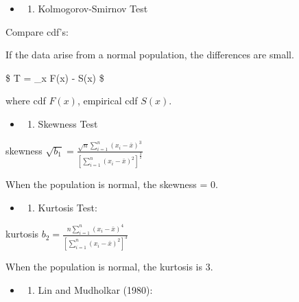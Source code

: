 \documentclass[
]{book}
\providecommand{\tightlist}{%
  \setlength{\itemsep}{0pt}\setlength{\parskip}{0pt}}
\begin{document}
{{{\begin{itemize}
\item
  \begin{enumerate}
  \def\labelenumi{\arabic{enumi}.}
  \setcounter{enumi}{1}
  \tightlist
  \item
    Kolmogorov-Smirnov Test
  \end{enumerate}
\end{itemize}

Compare cdf's:

If the data arise from a normal population, the differences are small.

\$
T = \sup\_x \left\vert F(x) - S(x) \right \vert
\$

where cdf \(F(x)\), empirical cdf \(S(x)\).

\begin{itemize}
\item
  \begin{enumerate}
  \def\labelenumi{\arabic{enumi}.}
  \setcounter{enumi}{2}
  \tightlist
  \item
    Skewness Test
  \end{enumerate}
\end{itemize}

skewness \(\sqrt{b_1} = \tfrac{\sqrt{n} \sum_{i=1}^n (x_i - \bar x)^3} {\left[ \sum_{i=1}^n (x_i - \bar x)^2 \right]^{\tfrac{3}{2}}}\)

When the population is normal, the skewness = 0.

\begin{itemize}
\item
  \begin{enumerate}
  \def\labelenumi{\arabic{enumi}.}
  \setcounter{enumi}{3}
  \tightlist
  \item
    Kurtosis Test:
  \end{enumerate}
\end{itemize}

kurtosis \({b_2} = \tfrac{n \sum_{i=1}^n (x_i - \bar x)^4} {\left[ \sum_{i=1}^n (x_i - \bar x)^2 \right]^{3}}\)

When the population is normal, the kurtosis is 3.

\begin{itemize}
\item
  \begin{enumerate}
  \def\labelenumi{\arabic{enumi}.}
  \setcounter{enumi}{4}
  \tightlist
  \item
    Lin and Mudholkar (1980):
  \end{enumerate}
\end{itemize}

}}}
\end{document}
